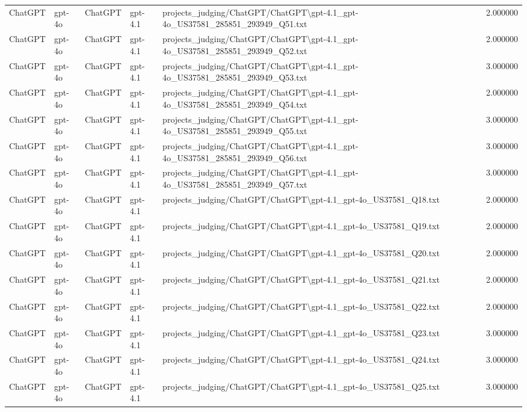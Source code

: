 \begin{table}[H]
\begin{tabular}{lllllr}
ChatGPT & gpt-4o & ChatGPT & gpt-4.1 & projects\_judging/ChatGPT/ChatGPT\textbackslash gpt-4.1\_gpt-4o\_US37581\_285851\_293949\_Q51.txt & 2.000000 \\
ChatGPT & gpt-4o & ChatGPT & gpt-4.1 & projects\_judging/ChatGPT/ChatGPT\textbackslash gpt-4.1\_gpt-4o\_US37581\_285851\_293949\_Q52.txt & 2.000000 \\
ChatGPT & gpt-4o & ChatGPT & gpt-4.1 & projects\_judging/ChatGPT/ChatGPT\textbackslash gpt-4.1\_gpt-4o\_US37581\_285851\_293949\_Q53.txt & 3.000000 \\
ChatGPT & gpt-4o & ChatGPT & gpt-4.1 & projects\_judging/ChatGPT/ChatGPT\textbackslash gpt-4.1\_gpt-4o\_US37581\_285851\_293949\_Q54.txt & 2.000000 \\
ChatGPT & gpt-4o & ChatGPT & gpt-4.1 & projects\_judging/ChatGPT/ChatGPT\textbackslash gpt-4.1\_gpt-4o\_US37581\_285851\_293949\_Q55.txt & 3.000000 \\
ChatGPT & gpt-4o & ChatGPT & gpt-4.1 & projects\_judging/ChatGPT/ChatGPT\textbackslash gpt-4.1\_gpt-4o\_US37581\_285851\_293949\_Q56.txt & 3.000000 \\
ChatGPT & gpt-4o & ChatGPT & gpt-4.1 & projects\_judging/ChatGPT/ChatGPT\textbackslash gpt-4.1\_gpt-4o\_US37581\_285851\_293949\_Q57.txt & 3.000000 \\
ChatGPT & gpt-4o & ChatGPT & gpt-4.1 & projects\_judging/ChatGPT/ChatGPT\textbackslash gpt-4.1\_gpt-4o\_US37581\_Q18.txt & 2.000000 \\
ChatGPT & gpt-4o & ChatGPT & gpt-4.1 & projects\_judging/ChatGPT/ChatGPT\textbackslash gpt-4.1\_gpt-4o\_US37581\_Q19.txt & 2.000000 \\
ChatGPT & gpt-4o & ChatGPT & gpt-4.1 & projects\_judging/ChatGPT/ChatGPT\textbackslash gpt-4.1\_gpt-4o\_US37581\_Q20.txt & 2.000000 \\
ChatGPT & gpt-4o & ChatGPT & gpt-4.1 & projects\_judging/ChatGPT/ChatGPT\textbackslash gpt-4.1\_gpt-4o\_US37581\_Q21.txt & 2.000000 \\
ChatGPT & gpt-4o & ChatGPT & gpt-4.1 & projects\_judging/ChatGPT/ChatGPT\textbackslash gpt-4.1\_gpt-4o\_US37581\_Q22.txt & 2.000000 \\
ChatGPT & gpt-4o & ChatGPT & gpt-4.1 & projects\_judging/ChatGPT/ChatGPT\textbackslash gpt-4.1\_gpt-4o\_US37581\_Q23.txt & 3.000000 \\
ChatGPT & gpt-4o & ChatGPT & gpt-4.1 & projects\_judging/ChatGPT/ChatGPT\textbackslash gpt-4.1\_gpt-4o\_US37581\_Q24.txt & 3.000000 \\
ChatGPT & gpt-4o & ChatGPT & gpt-4.1 & projects\_judging/ChatGPT/ChatGPT\textbackslash gpt-4.1\_gpt-4o\_US37581\_Q25.txt & 3.000000 \\

\end{tabular}
\end{table}

